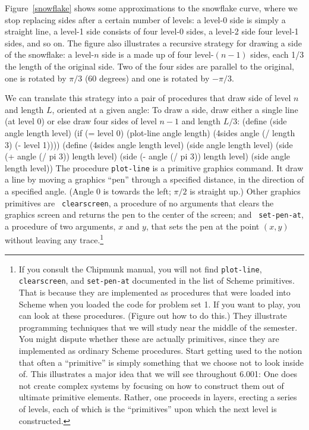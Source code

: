 Figure~\ref{snowflake} shows some approximations to the snowflake
curve, where we stop replacing sides after a certain number of levels:
a level-0 side is simply a straight line, a level-1 side consists of
four level-0 sides, a level-2 side four level-1 sides, and so on.  The
figure also illustrates a recursive strategy for drawing a side of
the snowflake: a level-$n$ side is a made up of four level-$(n-1)$ sides,
each 1/3 the length of the original side.  Two of the four sides are
parallel to the original, one is rotated by $\pi/3$ (60 degrees) and
one is rotated by $-\pi/3$.

We can translate this strategy into a pair of
procedures that draw side of level $n$ and length $L$, oriented at
a given angle: To draw a side, draw either a single line (at level 0)
or else draw four sides of level $n-1$ and length $L/3$:
\beginlisp
(define (side angle length level)
  (if (= level 0)
      (plot-line angle length)
      (4sides angle (/ length 3) (- level 1))))
\null
(define (4sides angle length level)
  (side angle length level) 
  (side (+ angle (/ pi 3)) length level)
  (side (- angle (/ pi 3)) length level)
  (side angle length level))
\endlisp
The procedure {\tt plot-line} is a primitive graphics command.  It
draw a line by moving a graphics ``pen'' through a specified distance,
in the direction of a specified angle. (Angle 0 is towards the left;
$\pi/2$ is straight up.)  Other graphics primitives are {\tt
clearscreen}, a procedure of no arguments that clears the graphics
screen and returns the pen to the center of the screen; and {\tt
set-pen-at}, a procedure of two arguments, $x$ and $y$, that sets the
pen at the point $(x,y)$ without leaving any trace.\footnote{If you
consult the Chipmunk manual, you will not find {\tt plot-line}, {\tt
clearscreen}, and {\tt set-pen-at} documented in the list of Scheme
primitives.  That is because they are implemented as procedures that
were loaded into Scheme when you loaded the code for problem set 1.
If you want to play, you can look at these procedures.  (Figure out
how to do this.)  They illustrate programming techniques that we will
study near the middle of the semester.  You might dispute whether
these are actually primitives, since they are implemented as ordinary
Scheme procedures.  Start getting used to the notion that often a
``primitive'' is simply something that we choose not to look inside
of.  This illustrates a major idea that we will see throughout 6.001:
One does not create complex systems by focusing on how to construct
them out of ultimate primitive elements.  Rather, one proceeds in
layers, erecting a series of levels, each of which is the
``primitives'' upon which the next level is constructed.}

